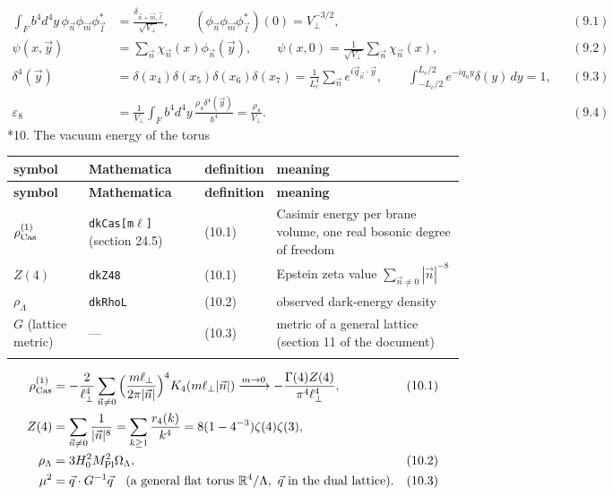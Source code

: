 \documentclass[10pt,a4paper]{article}
\makeatletter
\renewcommand\section{\@startsection{section}{1}{\z@}{-3.5ex \@plus -1ex \@minus -.2ex}{2.3ex \@plus.2ex}{\normalfont\Large\bfseries\raggedright}}
\makeatother
\begin{document}
\begin{align*}
\int_Fb^4d^4y\,\phi_{\vec n}\phi_{\vec m}\phi^*_{\vec l}&=\frac{\delta_{\vec n+\vec m,\vec l}}{\sqrt{V_\perp}},\qquad (\phi_{\vec n}\phi_{\vec m}\phi^*_{\vec l})(0)=V_\perp^{-3/2},&&(9.1) \\
\psi(x,\vec y)&=\sum_{\vec n}\chi_{\vec n}(x)\phi_{\vec n}(\vec y),\qquad \psi(x,0)=\frac1{\sqrt{V_\perp}}\sum_{\vec n}\chi_{\vec n}(x),&&(9.2) \\
\delta^4(\vec y)&=\delta(x_4)\delta(x_5)\delta(x_6)\delta(x_7)=\frac1{L_c^4}\sum_{\vec n}e^{i\vec q_{\vec n}\cdot\vec y},\qquad \int_{-L_c/2}^{L_c/2}e^{-iq_ny}\delta(y)\,dy=1,&&(9.3) \\
\varepsilon_8&=\frac1{V_\perp}\int_Fb^4d^4y\,\frac{\rho_4\delta^4(\vec y)}{b^4}=\frac{\rho_4}{V_\perp}.&&(9.4)
\end{align*}
\section*{10. The vacuum energy of the torus}
{\small
\begin{longtable}{>{\raggedright\arraybackslash}p{}>{\raggedright\arraybackslash}p{}>{\raggedright\arraybackslash}p{}>{\raggedright\arraybackslash}p{}}
\toprule
\textbf{symbol} & \textbf{Mathematica} & \textbf{definition} & \textbf{meaning} \\
\midrule\endfirsthead
\toprule
\textbf{symbol} & \textbf{Mathematica} & \textbf{definition} & \textbf{meaning} \\
\midrule\endhead
\endfoot
\bottomrule\endlastfoot
$\rho_{\rm Cas}^{(1)}$ & \texttt{dkCas[m\texorpdfstring{\ensuremath{\ell}}{ℓ}]} (section 24.5) & (10.1) & Casimir energy per brane volume, one real bosonic degree of freedom \\
$Z(4)$ & \texttt{dkZ48} & (10.1) & Epstein zeta value $\sum_{\vec n\ne0}|\vec n|^{-8}$ \\
$\rho_\Lambda$ & \texttt{dkRhoL} & (10.2) & observed dark-energy density \\
$G$ (lattice metric) & — & (10.3) & metric of a general lattice (section 11 of the document) \\*
\end{longtable}}
\begin{align*}
\rho_{\rm Cas}^{(1)}&=-\frac2{\ell_\perp^4}\sum_{\vec n\ne0}\Big(\frac{m\ell_\perp}{2\pi|\vec n|}\Big)^4K_4(m\ell_\perp|\vec n|)\xrightarrow{m\to0}-\frac{\Gamma(4)Z(4)}{\pi^4\ell_\perp^4},&&(10.1) \\
Z(4)&=\sum_{\vec n\ne0}\frac1{|\vec n|^8}=\sum_{k\ge1}\frac{r_4(k)}{k^4}=8(1-4^{-3})\zeta(4)\zeta(3), \\
\rho_\Lambda&=3H_0^2M_{\rm Pl}^2\Omega_\Lambda,&&(10.2) \\
\mu^2&=\vec q\cdot G^{-1}\vec q\quad(\text{a general flat torus }\mathbb R^4/\Lambda,\ \vec q\ \text{in the dual lattice}).&&(10.3)
\end{align*}
\end{document}
